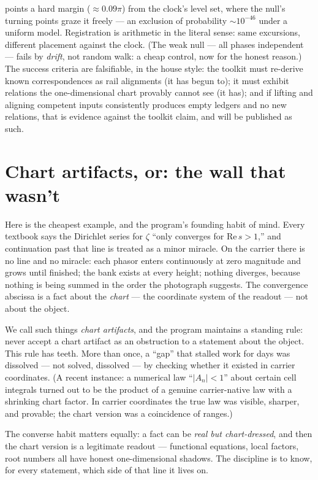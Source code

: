 \documentclass[11pt]{article}
\begin{document}
points a hard margin ($\approx0.09\pi$) from the clock's level set, where the
null's turning points graze it freely --- an exclusion of probability
$\sim10^{-46}$ under a uniform model.  Registration is arithmetic in the
literal sense: same excursions, different placement against the clock.  (The
weak null --- all phases independent --- fails by \emph{drift}, not random
walk: a cheap control, now for the honest reason.)
The success
criteria are falsifiable, in the house style: the toolkit must re-derive known
correspondences as rail alignments (it has begun to); it must exhibit relations
the one-dimensional chart provably cannot see (it has); and if lifting and
aligning competent inputs consistently produces empty ledgers and no new
relations, that is evidence against the toolkit claim, and will be published as
such.

\section{Chart artifacts, or: the wall that wasn't}

Here is the cheapest example, and the program's founding habit of mind.  Every
textbook says the Dirichlet series for $\zeta$ ``only converges for
$\mathrm{Re}\,s>1$,'' and continuation past that line is treated as a minor
miracle.  On the carrier there is no line and no miracle: each phasor enters
continuously at zero magnitude and grows until finished; the bank exists at every
height; nothing diverges, because nothing is being summed in the order the
photograph suggests.  The convergence abscissa is a fact about the \emph{chart} ---
the coordinate system of the readout --- not about the object.

We call such things \emph{chart artifacts}, and the program maintains a standing
rule: never accept a chart artifact as an obstruction to a statement about the
object.  This rule has teeth.  More than once, a ``gap'' that stalled work for days
was dissolved --- not solved, dissolved --- by checking whether it existed in
carrier coordinates.  (A recent instance: a numerical law ``$|A_n|<1$'' about
certain cell integrals turned out to be the product of a genuine carrier-native law
with a shrinking chart factor.  In carrier coordinates the true law was visible,
sharper, and provable; the chart version was a coincidence of ranges.)

The converse habit matters equally: a fact can be \emph{real but chart-dressed},
and then the chart version is a legitimate readout --- functional equations, local
factors, root numbers all have honest one-dimensional shadows.  The discipline is
to know, for every statement, which side of that line it lives on.
\end{document}
